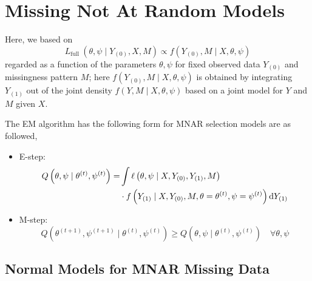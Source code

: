 \begin{example}

\end{example}

\section{Missing Not At Random Models}

Here, we based on
\begin{equation}
	L_{\text {full }}\left(\theta, \psi \mid Y_{(0)}, X, M\right) \propto f\left(Y_{(0)}, M \mid X, \theta, \psi\right)
\end{equation}
regarded as a function of the parameters \(\theta, \psi\) for fixed observed data \(Y_{(0)}\) and missingness pattern \(M\); here \(f\left(Y_{(0)}, M \mid X, \theta, \psi\right)\) is obtained by integrating \(Y_{(1)}\) out of the joint density \(f(Y, M \mid X, \theta, \psi)\) based on a joint model for \(Y\) and \(M\) given \(X\).

The EM algorithm has the following form for MNAR selection models are as followed,
\begin{itemize}
	\item E-step:
	      \begin{equation}
		      \begin{aligned}
			      Q\left(\theta, \psi \mid \theta^{(t)}, \psi^{(t)}\right)= & \int \ell\left(\theta, \psi \mid X, Y_{(0)}, Y_{(1)}, M\right)                                   \\
			                                                                & \cdot f\left(Y_{(1)}\mid X, Y_{(0)}, M, \theta=\theta^{(t)}, \psi=\psi^{(t)}\right) \mathop{}\!\mathrm{d} Y_{(1)}
		      \end{aligned}
	      \end{equation}
	\item M-step:
	      \begin{equation}
		      Q\left(\theta^{(t+1)}, \psi^{(t+1)} \mid \theta^{(t)}, \psi^{(t)}\right) \geq Q\left(\theta, \psi \mid \theta^{(t)}, \psi^{(t)}\right) \quad \forall\theta, \psi
	      \end{equation}
\end{itemize}

\subsection{Normal Models for MNAR Missing Data}

